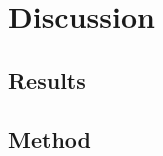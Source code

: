 \chapter{Discussion}
\label{cha:discussion}


\section{Results}
\label{sec:discussion-results}


\section{Method}
\label{sec:discussion-method}

